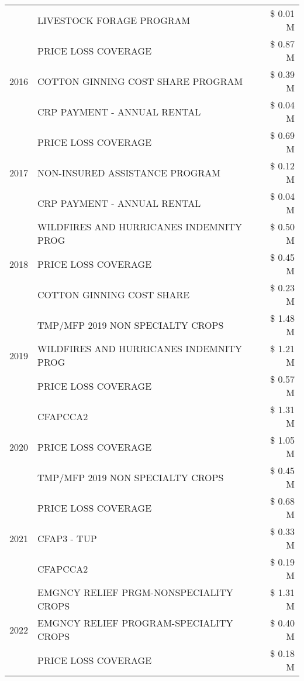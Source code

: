 \begin{tabular}{llr}
 & LIVESTOCK FORAGE PROGRAM & \$ 0.01 M \\
\cline{1-3}
\multirow[t]{3}{*}{2016} & PRICE LOSS COVERAGE & \$ 0.87 M \\
 & COTTON GINNING COST SHARE PROGRAM & \$ 0.39 M \\
 & CRP PAYMENT - ANNUAL RENTAL & \$ 0.04 M \\
\cline{1-3}
\multirow[t]{3}{*}{2017} & PRICE LOSS COVERAGE & \$ 0.69 M \\
 & NON-INSURED ASSISTANCE PROGRAM & \$ 0.12 M \\
 & CRP PAYMENT - ANNUAL RENTAL & \$ 0.04 M \\
\cline{1-3}
\multirow[t]{3}{*}{2018} & WILDFIRES AND HURRICANES INDEMNITY PROG & \$ 0.50 M \\
 & PRICE LOSS COVERAGE & \$ 0.45 M \\
 & COTTON GINNING COST SHARE & \$ 0.23 M \\
\cline{1-3}
\multirow[t]{3}{*}{2019} & TMP/MFP 2019 NON SPECIALTY CROPS & \$ 1.48 M \\
 & WILDFIRES AND HURRICANES INDEMNITY PROG & \$ 1.21 M \\
 & PRICE LOSS COVERAGE & \$ 0.57 M \\
\cline{1-3}
\multirow[t]{3}{*}{2020} & CFAPCCA2 & \$ 1.31 M \\
 & PRICE LOSS COVERAGE & \$ 1.05 M \\
 & TMP/MFP 2019 NON SPECIALTY CROPS & \$ 0.45 M \\
\cline{1-3}
\multirow[t]{3}{*}{2021} & PRICE LOSS COVERAGE & \$ 0.68 M \\
 & CFAP3 - TUP & \$ 0.33 M \\
 & CFAPCCA2 & \$ 0.19 M \\
\cline{1-3}
\multirow[t]{3}{*}{2022} & EMGNCY RELIEF PRGM-NONSPECIALITY CROPS & \$ 1.31 M \\
 & EMGNCY RELIEF PROGRAM-SPECIALITY CROPS & \$ 0.40 M \\
 & PRICE LOSS COVERAGE & \$ 0.18 M \\
\cline{1-3}
\bottomrule
\end{tabular}
